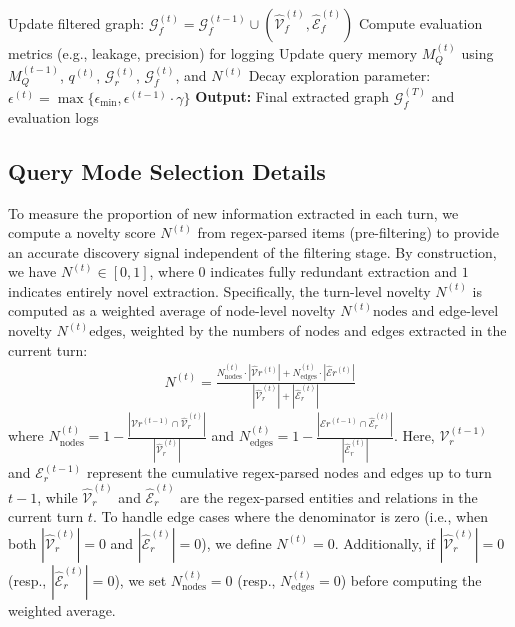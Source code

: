 \begin{algorithm*}[t!]
\begin{algorithmic}[1]
    \STATE\hspace{\algorithmicindent} Update filtered graph: $\mathcal{G}_f^{(t)} = \mathcal{G}_f^{(t-1)} \cup (\hat{\mathcal{V}}_f^{(t)}, \hat{\mathcal{E}}_f^{(t)})$
    \STATE Compute evaluation metrics (e.g., leakage, precision) for logging
    \STATE Update query memory $M_Q^{(t)}$ using $M_Q^{(t-1)}$, $q^{(t)}$, $\mathcal{G}_r^{(t)}$, $\mathcal{G}_f^{(t)}$, and $N^{(t)}$
    \STATE Decay exploration parameter: $\epsilon^{(t)} = \max\{\epsilon_{\min}, \epsilon^{(t-1)} \cdot \gamma\}$
\ENDFOR
\STATE \textbf{Output:} Final extracted graph $\mathcal{G}_f^{(T)}$ and evaluation logs
\end{algorithmic}
\end{algorithm*}


\subsection{Query Mode Selection Details}
\label{app:mode_selection}
To measure the proportion of new information extracted in each turn, we compute a novelty score $N^{(t)}$ from regex-parsed items (pre-filtering) to provide an accurate discovery signal independent of the filtering stage. By construction, we have $N^{(t)} \in [0, 1]$, where $0$ indicates fully redundant extraction and $1$ indicates entirely novel extraction. Specifically, the turn-level novelty $N^{(t)}$ is computed as a weighted average of node-level novelty $N^{(t)}{\text{nodes}}$ and edge-level novelty $N^{(t)}{\text{edges}}$, weighted by the numbers of nodes and edges extracted in the current turn:
\begin{align}
N^{(t)} = \frac{N_{\text{nodes}}^{(t)} \cdot |\hat{\mathcal{V}}r^{(t)}| + N_{\text{edges}}^{(t)} \cdot |\hat{\mathcal{E}}r^{(t)}|}{|\hat{\mathcal{V}}_r^{(t)}| + |\hat{\mathcal{E}}_r^{(t)}|}
\end{align}
where $N_{\text{nodes}}^{(t)} = 1 - \frac{|\mathcal{V}r^{(t-1)} \cap \hat{\mathcal{V}}_r^{(t)}|}{|\hat{\mathcal{V}}_r^{(t)}|}$ and $N_{\text{edges}}^{(t)} = 1 - \frac{|\mathcal{E}{r}^{(t-1)} \cap \hat{\mathcal{E}}_r^{(t)}|}{|\hat{\mathcal{E}}_r^{(t)}|}$. Here, $\mathcal{V}_r^{(t-1)}$ and $\mathcal{E}_{r}^{(t-1)}$ represent the cumulative regex-parsed nodes and edges up to turn $t-1$, while $\hat{\mathcal{V}}_r^{(t)}$ and $\hat{\mathcal{E}}_r^{(t)}$ are the regex-parsed entities and relations in the current turn $t$. To handle edge cases where the denominator is zero (i.e., when both $|\hat{\mathcal{V}}_r^{(t)}| = 0$ and $|\hat{\mathcal{E}}_r^{(t)}| = 0$), we define $N^{(t)} = 0$. Additionally, if $|\hat{\mathcal{V}}_r^{(t)}| = 0$ (resp., $|\hat{\mathcal{E}}_r^{(t)}| = 0$), we set $N_{\text{nodes}}^{(t)} = 0$ (resp., $N_{\text{edges}}^{(t)} = 0$) before computing the weighted average.
